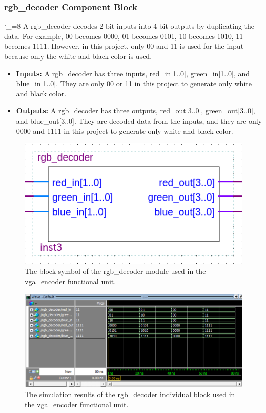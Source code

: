 \documentclass[a4paper]{article}
\begin{document}
\subsubsection{rgb_decoder Component Block}
\catcode`_=8
A rgb\_decoder decodes 2-bit inputs into 4-bit outputs by duplicating the data. For example, 00 becomes 0000, 01 becomes 0101, 10 becomes 1010, 11 becomes 1111. However, in this project, only 00 and 11 is used for the input because only the white and black color is used.
\begin{itemize}
\item \textbf{Inputs:  } A rgb\_decoder has three inputs, red\_in[1..0], green\_in[1..0], and blue\_in[1..0]. They are only 00 or 11 in this project to generate only white and black color.
\item \textbf{Outputs: }  A rgb\_decoder has three outputs, red\_out[3..0], green\_out[3..0], and blue\_out[3..0]. They are decoded data from the inputs, and they are only 0000 and 1111 in this project to generate only white and black color.
\end{itemize}
\begin{figure}[h]
\centering
\includegraphics[width=.48\textwidth]{functional_units/vga_encoder/individual_blocks/rgb_decoder_symbol.png}
\caption{The block symbol of the rgb\_decoder module used in the vga\_encoder functional unit.}
\end{figure}
\begin{figure}[h]
  \centering
  \includegraphics[width=.98\textwidth]{functional_units/vga_encoder/individual_blocks/rgb_decoder_sim.png}
  \caption{The simulation results of the rgb\_decoder individual block used in the vga\_encoder functional unit.}
    \label{fig:individual-1-2-sim}
\end{figure}
\clearpage
\end{document}
